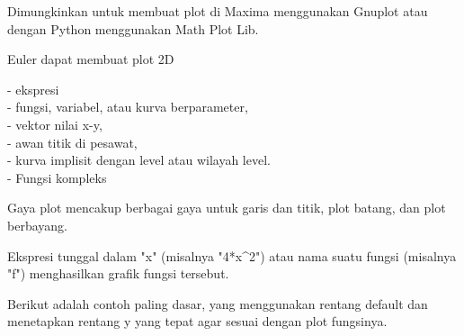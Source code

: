 \documentclass{article}
\begin{document}
\begin{eulernotebook}
\begin{eulercomment}
\begin{eulercomment}
\begin{eulercomment}
Dimungkinkan untuk membuat plot di Maxima menggunakan Gnuplot atau
dengan Python menggunakan Math Plot Lib.

Euler dapat membuat plot 2D

- ekspresi\\
- fungsi, variabel, atau kurva berparameter,\\
- vektor nilai x-y,\\
- awan titik di pesawat,\\
- kurva implisit dengan level atau wilayah level.\\
- Fungsi kompleks

Gaya plot mencakup berbagai gaya untuk garis dan titik, plot batang,
dan plot berbayang.

\begin{eulercomment}
\begin{eulercomment}
Ekspresi tunggal dalam "x" (misalnya "4*x\textasciicircum{}2") atau nama suatu fungsi
(misalnya "f") menghasilkan grafik fungsi tersebut.

Berikut adalah contoh paling dasar, yang menggunakan rentang default
dan menetapkan rentang y yang tepat agar sesuai dengan plot fungsinya.


\end{eulercomment}
\end{eulercomment}
\end{eulercomment}
\end{eulercomment}
\end{eulercomment}
\end{eulernotebook}
\end{document}
